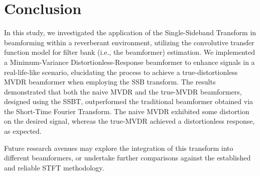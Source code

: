 \section{Conclusion}
\label{sec:conclusion}

In this study, we investigated the application of the Single-Sideband Transform in beamforming within a reverberant environment, utilizing the convolutive transfer function model for filter bank (i.e., the beamformer) estimation. We implemented a Minimum-Variance Distortionless-Response beamformer to enhance signals in a real-life-like scenario, elucidating the process to achieve a true-distortionless MVDR beamformer when employing the SSB transform. The results demonstrated that both the naive MVDR and the true-MVDR beamformers, designed using the SSBT, outperformed the traditional beamformer obtained via the Short-Time Fourier Transform. The naive MVDR exhibited some distortion on the desired signal, whereas the true-MVDR achieved a distortionless response, as expected.

Future research avenues may explore the integration of this transform into different beamformers, or undertake further comparisons against the established and reliable STFT methodology.